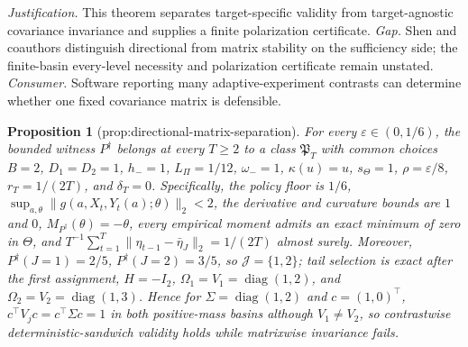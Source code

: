 \documentclass{article}
\newtheorem{proposition}{Proposition}
\begin{document}
\par\smallskip\noindent \textit{Justification.} This theorem separates target-specific validity from target-agnostic covariance invariance and supplies a finite polarization certificate. \textit{Gap.} Shen and coauthors distinguish directional from matrix stability on the sufficiency side; the finite-basin every-level necessity and polarization certificate remain unstated. \textit{Consumer.} Software reporting many adaptive-experiment contrasts can determine whether one fixed covariance matrix is defensible.

\begin{proposition}[prop:directional-matrix-separation]\label{prop:directional-matrix-separation}
For every \(\varepsilon\in(0,1/6)\), the bounded witness \(P^{\dagger}\) belongs at every \(T\ge2\) to a class \(\mathfrak P_T\) with common choices \(B=2\), \(D_1=D_2=1\), \(h_-=1\), \(L_\Pi=1/12\), \(\omega_-=1\), \(\kappa(u)=u\), \(s_\Theta=1\), \(\rho=\varepsilon/8\), \(r_T=1/(2T)\), and \(\delta_T=0\). Specifically, the policy floor is \(1/6\), \(\sup_{a,\theta}\|g(a,X_t,Y_t(a);\theta)\|_2<2\), the derivative and curvature bounds are \(1\) and \(0\), \(M_{P^{\dagger}}(\theta)=-\theta\), every empirical moment admits an exact minimum of zero in \(\Theta\), and \(T^{-1}\sum_{t=1}^T\|\eta_{t-1}-\bar\eta_J\|_2=1/(2T)\) almost surely. Moreover, \(P^{\dagger}(J=1)=2/5\), \(P^{\dagger}(J=2)=3/5\), so \(\mathcal J=\{1,2\}\); tail selection is exact after the first assignment, \(H=-I_2\), \(\Omega_1=V_1=\operatorname{diag}(1,2)\), and \(\Omega_2=V_2=\operatorname{diag}(1,3)\). Hence for \(\Sigma=\operatorname{diag}(1,2)\) and \(c=(1,0)^\top\), \(c^\top V_jc=c^\top\Sigma c=1\) in both positive-mass basins although \(V_1\ne V_2\), so contrastwise deterministic-sandwich validity holds while matrixwise invariance fails.
\end{proposition}
\end{document}
